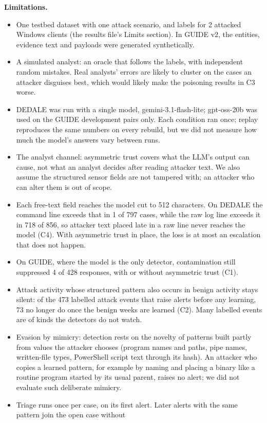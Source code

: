 \documentclass[conference]{IEEEtran}
\begin{document}
\textbf{Limitations.}
\begin{itemize}
\item One testbed dataset with one attack scenario, and labels for 2 attacked Windows clients (the results file's
Limits section). In GUIDE v2,
the entities, evidence text and payloads were generated synthetically.
\item A simulated analyst: an oracle that follows the labels, with independent random mistakes. Real analysts'
errors are likely to cluster on the cases an attacker disguises best, which would likely make the poisoning results
in C3 worse.
\item DEDALE was run with a single model, gemini-3.1-flash-lite; gpt-oss-20b was used on the GUIDE development pairs
only. Each condition ran once; replay reproduces the same numbers on every rebuild, but we did not measure how much
the model's answers vary between runs.
\item The analyst channel: asymmetric trust covers what the LLM's output can cause, not what an analyst decides
after reading attacker text. We also assume the structured sensor fields are not tampered with; an attacker who can
alter them is out of scope.
\item Each free-text field reaches the model cut to 512 characters. On DEDALE the command line exceeds that in 1 of
797 cases, while the raw log line exceeds it in 718 of 856, so attacker text placed late in a raw line never reaches
the model (C4). With asymmetric trust in place, the loss is at most an escalation that does not happen.
\item On GUIDE, where the model is the only detector, contamination still suppressed 4 of 428 responses, with or
without asymmetric trust (C1).
\item Attack activity whose structured pattern also occurs in benign activity stays silent: of the 473 labelled
attack events that raise alerts before any learning, 73 no longer do once the benign weeks are learned (C2). Many
labelled events are of kinds the detectors do not watch.
\item Evasion by mimicry: detection rests on the novelty of patterns built partly from values the attacker chooses
(program names and paths, pipe names, written-file types, PowerShell script text through its hash). An attacker who
copies a learned pattern, for example by naming and placing a binary like a routine program started by its usual
parent, raises no alert; we did not evaluate such deliberate mimicry.
\item Triage runs once per case, on its first alert. Later alerts with the same pattern join the open case without

\end{itemize}
\end{document}
